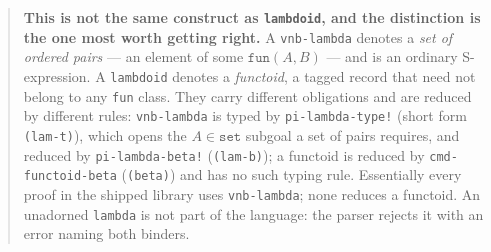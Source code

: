 \begin{itemize}
  \begin{quote}
  \textbf{This is not the same construct as \texttt{lambdoid}, and the
  distinction is the one most worth getting right.}  A \texttt{vnb-lambda}
  denotes a \emph{set of ordered pairs} --- an element of some
  $\mathtt{fun}(A,B)$ --- and is an ordinary S-expression.  A
  \texttt{lambdoid} denotes a \emph{functoid}, a tagged record that need not
  belong to any \texttt{fun} class.  They carry different obligations and are
  reduced by different rules: \texttt{vnb-lambda} is typed by
  \texttt{pi-lambda-type!} (short form \texttt{(lam-t)}), which opens the
  $A \in \mathtt{set}$ subgoal a set of pairs requires, and reduced by
  \texttt{pi-lambda-beta!} (\texttt{(lam-b)}); a functoid is reduced by
  \texttt{cmd-functoid-beta} (\texttt{(beta)}) and has no such typing rule.
  Essentially every proof in the shipped library uses \texttt{vnb-lambda};
  none reduces a functoid.  An unadorned \texttt{lambda} is not part of the
  language: the parser rejects it with an error naming both binders.
  \end{quote}


\end{itemize}
